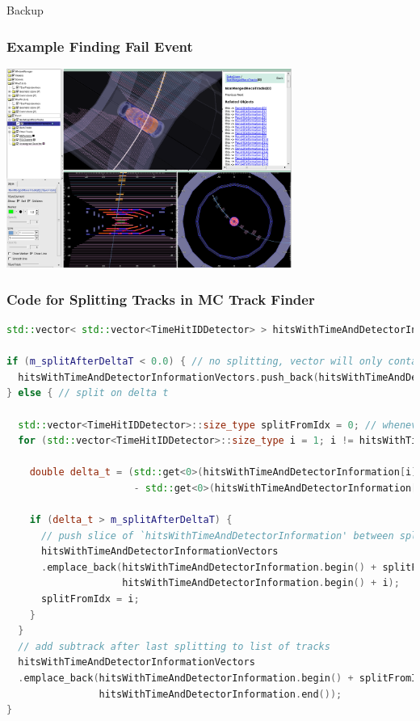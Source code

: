 \documentclass[18pt]{beamer}
\begin{document}
\appendix
\backupbegin

\begin{frame}
  \begin{center}
    \huge Backup
  \end{center}
\end{frame}

  \begin{frame}
  \begin{center}
    \frametitle{Example Finding Fail Event}
    \includegraphics[width=0.7\textwidth]{figures/b2display_screenshots/b2display_example_1trackevt.png}
  \end{center}
\end{frame}

\begin{frame}[fragile]
  \frametitle{Code for Splitting Tracks in MC Track Finder}
\begin{lstlisting}[language=C++]
std::vector< std::vector<TimeHitIDDetector> > hitsWithTimeAndDetectorInformationVectors;

if (m_splitAfterDeltaT < 0.0) { // no splitting, vector will only contain a single hitInformation vector
  hitsWithTimeAndDetectorInformationVectors.push_back(hitsWithTimeAndDetectorInformation);
} else { // split on delta t

  std::vector<TimeHitIDDetector>::size_type splitFromIdx = 0; // whenever splitting subtrack, start slice from this index
  for (std::vector<TimeHitIDDetector>::size_type i = 1; i != hitsWithTimeAndDetectorInformation.size(); i++) {

    double delta_t = (std::get<0>(hitsWithTimeAndDetectorInformation[i])
                      - std::get<0>(hitsWithTimeAndDetectorInformation[i - 1]));

    if (delta_t > m_splitAfterDeltaT) {
      // push slice of `hitsWithTimeAndDetectorInformation' between splitFromidx  and previous index
      hitsWithTimeAndDetectorInformationVectors
      .emplace_back(hitsWithTimeAndDetectorInformation.begin() + splitFromIdx,
                    hitsWithTimeAndDetectorInformation.begin() + i);
      splitFromIdx = i;
    }
  }
  // add subtrack after last splitting to list of tracks
  hitsWithTimeAndDetectorInformationVectors
  .emplace_back(hitsWithTimeAndDetectorInformation.begin() + splitFromIdx,
                hitsWithTimeAndDetectorInformation.end());
}
\end{lstlisting}
\end{frame}
\backupend
\end{document}
